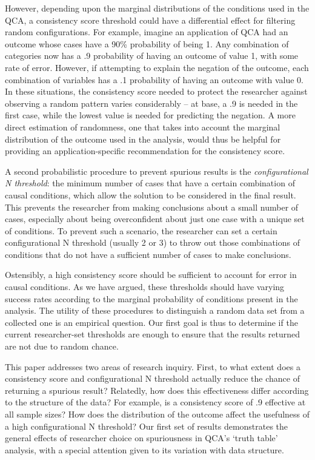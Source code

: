 \documentclass[12pt]{article}
\begin{document}
{{{{However, depending upon the marginal distributions of the conditions used in the QCA, a consistency score threshold could have a differential effect for filtering random configurations. For example, imagine an application of QCA had an outcome whose cases have a 90\% probability of being 1. Any combination of categories now has a .9 probability of having an outcome of value 1, with some rate of error. However, if attempting to explain the negation of the outcome, each combination of variables has a .1 probability of having an outcome with value 0. In these situations, the consistency score needed to protect the researcher against observing a random pattern varies considerably -- at base, a .9 is needed in the first case, while the lowest value is needed for predicting the negation. A more direct estimation of randomness, one that takes into account the marginal distribution of the outcome used in the analysis, would thus be helpful for providing an application-specific recommendation for the consistency score. 

A second probabilistic procedure to prevent spurious results is the {\it{configurational N threshold}}:  the minimum number of cases that have a certain combination of causal conditions, which allow the solution to be considered in the final result. This prevents the researcher from making conclusions about a small number of cases, especially about being overconfident about just one case with a unique set of conditions. To prevent such a scenario, the researcher can set a certain configurational N threshold (usually 2 or 3) to throw out those combinations of conditions that do not have a sufficient number of cases to make conclusions. 

Ostensibly, a high consistency score should be sufficient to account for error in causal conditions. As we have argued, these thresholds should have varying success rates according to the marginal probability of conditions present in the analysis. The utility of these procedures to distinguish a random data set from a collected one is an empirical question. Our first goal is thus to determine if the current researcher-set thresholds are enough to ensure that the results returned are not due to random chance. 

This paper addresses two areas of research inquiry. First, to what extent does a consistency score and configurational N threshold actually reduce the chance of returning a spurious result? Relatedly, how does this effectiveness differ according to the structure of the data? For example, is a consistency score of .9 effective at all sample sizes? How does the distribution of the outcome affect the usefulness of a high configurational N threshold? Our first set of results demonstrates the general effects of researcher choice on spuriousness in QCA's `truth table' analysis, with a special attention given to its variation with data structure. 

}}}}
\end{document}
